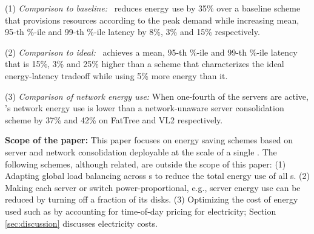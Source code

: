 (1) \emph{Comparison to baseline:}  \shrink\ reduces energy use by 35\% over a baseline scheme that provisions resources according to the peak demand while increasing mean, 95-th \%-ile and 99-th \%-ile latency by 8\%, 3\% and 15\% respectively. 

(2) \emph{Comparison to ideal:}  \shrink\ achieves a mean, 95-th \%-ile and 99-th \%-ile latency that is 15\%, 3\% and 25\% higher than a scheme that characterizes the ideal energy-latency tradeoff while using 5\% more energy than it.

(3) \emph{Comparison of network energy use:} When one-fourth of the servers are active, \shrink's network energy use is lower than a network-unaware server consolidation scheme by 37\% and 42\% on FatTree \cite{fattree} and VL2 \cite{vl2} respectively.

\textbf{Scope of the paper:} This paper focuses on energy saving schemes based on server and network consolidation deployable at the scale of a single \cdc. The following schemes, although related, are outside the scope of this paper: (1) Adapting global load balancing across \cdc s to reduce the total energy use of all \cdc s. (2) Making each server or switch power-proportional, e.g., server energy use can be reduced by turning off a fraction of its disks. (3) Optimizing the cost of energy used such as by accounting for time-of-day pricing for electricity; Section \ref{sec:discussion} discusses electricity costs.





